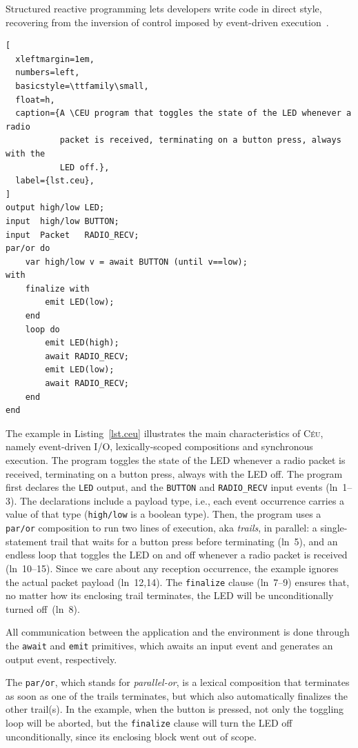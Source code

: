 \documentclass[sigplan,10pt,review,anonymous]{acmart}\settopmatter{printfolios=true,printccs=false,printacmref=false}
\newcommand{\CEU}{\textsc{C\'{e}u}\xspace}
\newcommand{\code}[1] {{\small{\texttt{#1}}}}
\begin{document}
Structured reactive programming lets developers write code in direct style,
recovering from the inversion of control imposed by event-driven
execution~\cite{rp.deprecating,rp.rescala,sync_async.cooperative}.

\begin{lstlisting}[
  xleftmargin=1em,
  numbers=left,
  basicstyle=\ttfamily\small,
  float=h,
  caption={A \CEU program that toggles the state of the LED whenever a radio
           packet is received, terminating on a button press, always with the
           LED off.},
  label={lst.ceu},
]
output high/low LED;
input  high/low BUTTON;
input  Packet   RADIO_RECV;
par/or do
    var high/low v = await BUTTON (until v==low);
with
    finalize with
        emit LED(low);
    end
    loop do
        emit LED(high);
        await RADIO_RECV;
        emit LED(low);
        await RADIO_RECV;
    end
end
\end{lstlisting}

The example in Listing~\ref{lst.ceu} illustrates the main characteristics of
\CEU, namely event-driven I/O, lexically-scoped compositions and synchronous
execution.
%
The program toggles the state of the LED whenever a radio packet is received,
terminating on a button press, always with the LED off.
%
The program first declares the \code{LED} output, and the \code{BUTTON} and
\code{RADIO\_RECV} input events (ln~1--3).
The declarations include a payload type, i.e., each event occurrence carries
a value of that type (\code{high/low} is a boolean type).
%
Then, the program uses a \code{par/or} composition to run two lines of
execution, aka \emph{trails}, in parallel:
a single-statement trail that waits for a button press before terminating
(ln~5), and an endless loop that toggles the LED on and off whenever a radio
packet is received (ln~10--15).
Since we care about any reception occurrence, the example ignores the actual
packet payload (ln~12,14).
The \code{finalize} clause (ln~7--9) ensures that, no matter how its enclosing
trail terminates, the LED will be unconditionally turned off~(ln~8).

All communication between the application and the environment is done through
the \code{await} and \code{emit} primitives, which awaits an input event and
generates an output event, respectively.

The \code{par/or}, which stands for \emph{parallel-or}, is a lexical
composition that terminates as soon as one of the trails terminates, but which
also automatically finalizes the other trail(s).
%
In the example, when the button is pressed, not only the toggling loop will be
aborted, but the \code{finalize} clause will turn the LED off unconditionally,
since its enclosing block went out of scope.
\end{document}
